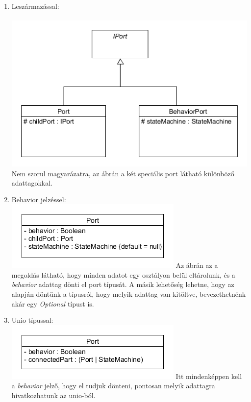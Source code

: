 \documentclass[a4paper,12pt]{report}
\begin{document}
\begin{enumerate}
\item Leszármazással: \\\\
\includegraphics[scale=0.7]{behav_generalport_diag.png} \\
Nem szorul magyarázatra, az ábrán a két speciális port látható különböző adattagokkal.

\item Behavior jelzéssel: \\
\includegraphics[scale=0.7]{simple_port_diag.png}
Az ábrán az a megoldás látható, hogy minden adatot egy osztályon belül eltárolunk, és a \textit{behavior} adattag dönti el port típusát. A másik lehetőség lehetne, hogy az alapján döntünk a típusról, hogy melyik adattag van kitöltve, bevezethetnénk akár egy \textit{Optional} típust is. 

\item Unio típussal: \\
\includegraphics[scale=0.7]{unio_port_diag.png}
Itt mindenképpen kell a \textit{behavior} jelző, hogy el tudjuk dönteni, pontosan melyik adattagra hivatkozhatunk az unio-ból. 
\end{enumerate}
\end{document}
